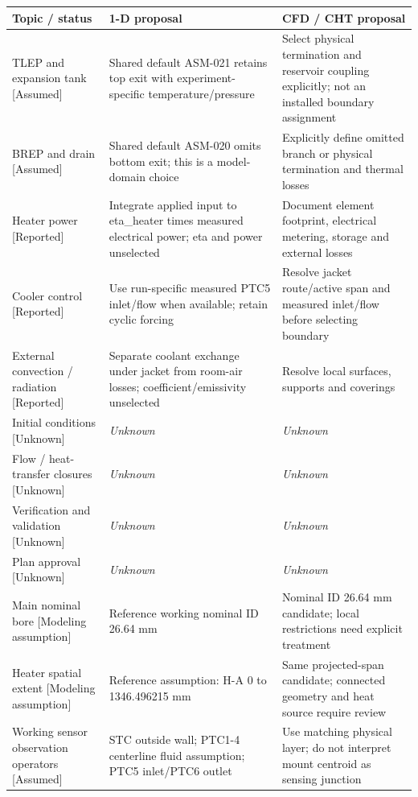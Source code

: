 \documentclass[11pt]{article}
\begin{document}
\begin{longtable}{>{\raggedright\arraybackslash}p{}>{\raggedright\arraybackslash}p{}>{\raggedright\arraybackslash}p{}}
\toprule
\textbf{Topic / status} & \textbf{1-D proposal} & \textbf{CFD / CHT proposal}\\\midrule\endhead
TLEP and expansion tank [Assumed] & Shared default ASM-021 retains top exit with experiment-specific temperature/pressure & Select physical termination and reservoir coupling explicitly; not an installed boundary assignment\\[4pt]
BREP and drain [Assumed] & Shared default ASM-020 omits bottom exit; this is a model-domain choice & Explicitly define omitted branch or physical termination and thermal losses\\[4pt]
Heater power [Reported] & Integrate applied input to eta\_\allowbreak{}heater times measured electrical power; eta and power unselected & Document element footprint, electrical metering, storage and external losses\\[4pt]
Cooler control [Reported] & Use run-specific measured PTC5 inlet/flow when available; retain cyclic forcing & Resolve jacket route/active span and measured inlet/flow before selecting boundary\\[4pt]
External convection / radiation [Reported] & Separate coolant exchange under jacket from room-air losses; coefficient/emissivity unselected & Resolve local surfaces, supports and coverings\\[4pt]
Initial conditions [Unknown] & \textit{Unknown} & \textit{Unknown}\\[4pt]
Flow / heat-transfer closures [Unknown] & \textit{Unknown} & \textit{Unknown}\\[4pt]
Verification and validation [Unknown] & \textit{Unknown} & \textit{Unknown}\\[4pt]
Plan approval [Unknown] & \textit{Unknown} & \textit{Unknown}\\[4pt]
Main nominal bore [Modeling assumption] & Reference working nominal ID 26.64 mm & Nominal ID 26.64 mm candidate; local restrictions need explicit treatment\\[4pt]
Heater spatial extent [Modeling assumption] & Reference assumption: H-A 0 to 1346.496215 mm & Same projected-span candidate; connected geometry and heat source require review\\[4pt]
Working sensor observation operators [Assumed] & STC outside wall; PTC1-4 centerline fluid assumption; PTC5 inlet/PTC6 outlet & Use matching physical layer; do not interpret mount centroid as sensing junction\\[4pt]

\end{longtable}
\end{document}
